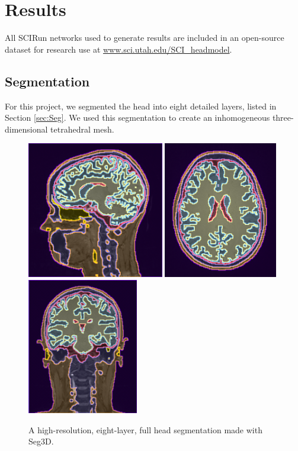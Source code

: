 %

\section{Results}
\label{sec:results}

All SCIRun networks used to generate results are included in an open-source dataset for research use at \url{www.sci.utah.edu/SCI_headmodel}.

\subsection{Segmentation}

For this project, we segmented the head into eight detailed layers, listed in Section \ref{sec:Seg}. We used this segmentation to create an inhomogeneous three-dimensional tetrahedral mesh.

\begin{figure}[H]
\begin{center}
\includegraphics[height=2.35in]{Figures/seg_1}
\includegraphics[height=2.35in]{Figures/seg_2}
\includegraphics[height=2.35in]{Figures/seg_3}
\caption{A high-resolution, eight-layer, full head segmentation made with Seg3D.}
\label{fig:fullseg}
\end{center}
\end{figure}


